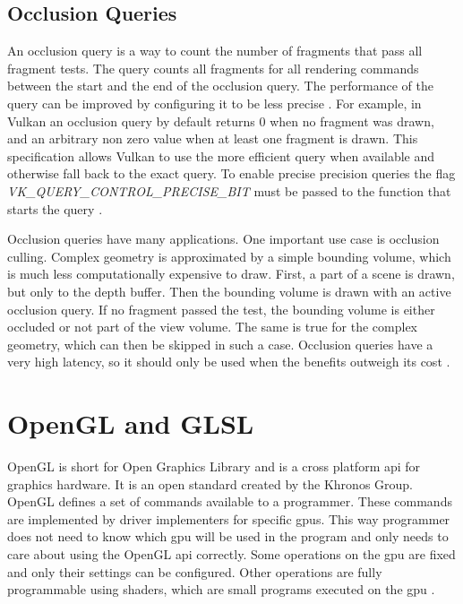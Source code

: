 \subsection{Occlusion Queries}
An occlusion query is a way to count the number of fragments that pass all fragment tests. The query counts all fragments for all rendering commands between the start and the end of the occlusion query. The performance of the query can be improved by configuring it to be less precise \cite{akine:2018:realtime}. For example, in Vulkan an occlusion query by default returns 0 when no fragment was drawn, and an arbitrary non zero value when at least one fragment is drawn. This specification allows Vulkan to use the more efficient query when available and otherwise fall back to the exact query. To enable precise precision queries the flag \textit{VK\_QUERY\_CONTROL\_PRECISE\_BIT} must be passed to the function that starts the query \cite{khronos:vulkan:spec1.1}.

Occlusion queries have many applications. One important use case is occlusion culling. Complex geometry is approximated by a simple bounding volume, which is much less computationally expensive to draw. First, a part of a scene is drawn, but only to the depth buffer. Then the bounding volume is drawn with an active occlusion query. If no fragment passed the test, the bounding volume is either occluded or not part of the view volume. The same is true for the complex geometry, which can then be skipped in such a case. Occlusion queries have a very high latency, so it should only be used when the benefits outweigh its cost   \cite{akine:2018:realtime, sellers:vulkanprogramming}.

\section{OpenGL and GLSL}
OpenGL is short for Open Graphics Library and is a cross platform \gls{api} for graphics hardware. It is an open standard created by the Khronos Group. OpenGL defines a set of commands available to a programmer. These commands are implemented by driver implementers for specific \glspl{gpu}. This way programmer does not need to know which \gls{gpu} will be used in the program and only needs to care about using the OpenGL \gls{api} correctly. Some operations on the \gls{gpu} are fixed and only their settings can be configured. Other operations are fully programmable using shaders, which are small programs executed on the \gls{gpu} \cite{khronos:glsl4.60:spec}.

